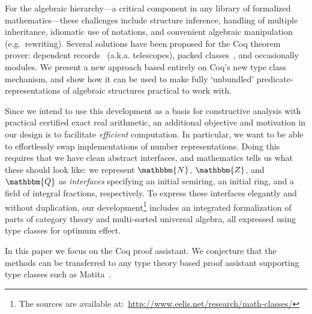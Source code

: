 \documentclass[a4paper,10pt,runningheads]{llncs}
\newcommand{\N}{\ensuremath{\mathbbm{N}}}
\newcommand{\Z}{\ensuremath{\mathbbm{Z}}}
\newcommand{\Q}{\ensuremath{\mathbbm{Q}}}
\begin{document}
For the algebraic hierarchy---a critical component in any library of formalized mathematics---these challenges include structure inference, handling of multiple inheritance, idiomatic use of notations, and convenient algebraic manipulation (e.g.\ rewriting). Several solutions have been proposed for the Coq theorem prover: dependent records~\cite{DBLP:journals/jsc/GeuversPWZ02} (a.k.a. telescopes), packed classes~\cite{Packed}, and occasionally modules. We present a new approach based entirely on Coq's new type class mechanism, and show how it can be used to make fully `unbundled' predicate-representations of algebraic structures practical to work with.

Since we intend to use this development as a basis for constructive analysis with practical certified exact real arithmetic, an additional objective and motivation in our design is to facilitate \emph{efficient} computation. In particular, we want to be able to effortlessly swap implementations of number representations. Doing this requires that we have clean abstract interfaces, and mathematics tells us what these should look like: we represent $\N$, $\Z$, and $\Q$ as \emph{interfaces} specifying an initial semiring, an initial ring, and a field of integral fractions, respectively. To express these interfaces elegantly and without duplication, our development\footnote{The sources are available
at:~\url{http://www.eelis.net/research/math-classes/}} includes an integrated formalization of parts of category theory and multi-sorted universal algebra, all expressed using type classes for optimum effect.

In this paper we focus on the Coq proof assistant. We conjecture that the methods can be transferred
to any type theory based proof assistant supporting type classes such as
Matita~\cite{asperti2007user}.
\end{document}
